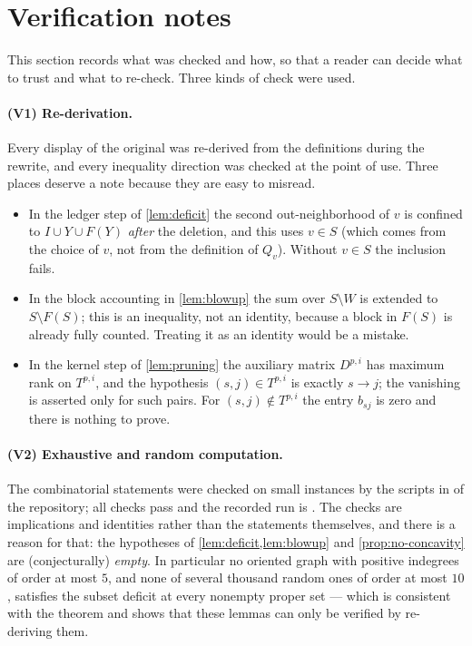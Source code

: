 \section{Verification notes}\label{app:checks}

This section records what was checked and how, so that a reader can decide what to trust and what to
re-check. Three kinds of check were used.

\paragraph{(V1) Re-derivation.} Every display of the original was re-derived from the definitions
during the rewrite, and every inequality direction was checked at the point of use. Three places
deserve a note because they are easy to misread.
\begin{itemize}[leftmargin=1.4em,itemsep=2pt,topsep=2pt]
\item In the ledger step of \cref{lem:deficit} the second out-neighborhood of $v$ is confined to $I\cup Y\cup F(Y)$
 \emph{after} the deletion, and this uses $v\in S$ (which comes from the choice of $v$, not from the
 definition of $Q_v$). Without $v\in S$ the inclusion fails.
\item In the block accounting in \cref{lem:blowup} the sum over $S\setminus W$ is extended to $S\setminus F(S)$; this is an
 inequality, not an identity, because a block in $F(S)$ is already fully counted. Treating it as an
 identity would be a mistake.
\item In the kernel step of \cref{lem:pruning} the auxiliary matrix $D^{p,i}$ has maximum rank on $T^{p,i}$, and the
 hypothesis $(s,j)\in T^{p,i}$ is exactly $s\to j$; the vanishing is asserted only for such pairs.
 For $(s,j)\notin T^{p,i}$ the entry $b_{sj}$ is zero and there is nothing to prove.
\end{itemize}

\paragraph{(V2) Exhaustive and random computation.} The combinatorial statements were checked on
small instances by the scripts in  of the repository; all checks pass and the
recorded run is . The checks are implications and identities rather than the
statements themselves, and there is a reason for that: the hypotheses of \cref{lem:deficit,lem:blowup}
and \cref{prop:no-concavity} are (conjecturally) \emph{empty}. In particular no oriented graph with
positive indegrees of order at most $5$, and none of several thousand random ones of order at most
$10$, satisfies the subset deficit at every nonempty proper set --- which is consistent with the
theorem and shows that these lemmas can only be verified by re-deriving them.

